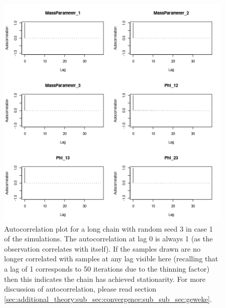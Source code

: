 \documentclass[14pt]{extarticle} %
\begin{document}
	\begin{figure}[!htb]
		\centering
		\includegraphics[scale=0.65]{Images/Gen_data/Case_1/Auto_correlation_plot_3.png}
		\caption{Autocorrelation plot for a long chain with random seed 3 in case 1 of the simulations. The autocorrelation at lag 0 is always 1 (as the observation correlates with itself). If the samples drawn are no longer correlated with samples at any lag visible here (recalling that a lag of 1 corresponds to 50 iterations due to the thinning factor) then this indicates the chain has achieved stationarity. For more discussion of autocorrelation, please read section \ref{sec:additional_theory:sub_sec:convergence:sub_sub_sec:geweke}.}
		\label{fig:gen_data_case_1_autocorrelation_plot_3}
	\end{figure}
\end{document}
